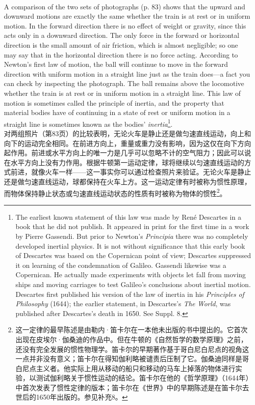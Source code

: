 \documentclass{article}
\begin{document}
\\
A comparison of the two sets of photographs (p. 83) shows that the upward and downward motions are exactly the same whether the train is at rest or in uniform motion. In the forward direction there is no effect of weight or gravity, since this acts only in a downward direction. The only force in the forward or horizontal direction is the small amount of air friction, which is almost negligible; so one may say that in the horizontal direction there is no force acting. According to Newton's first law of motion, the ball will continue to move in the forward direction with uniform motion in a straight line just as the train does—a fact you can check by inspecting the photograph. The ball remains above the locomotive whether the train is at rest or in uniform motion in a straight line. This law of motion is sometimes called the principle of inertia, and the property that material bodies have of continuing in a state of rest or uniform motion in a straight line is sometimes known as the bodies' \textit{inertia}\footnote{The earliest known statement of this law was made by René Descartes in a book that he did not publish. It appeared in print for the first time in a work by Pierre Gassendi. But prior to Newton's \textit{Principia} there was no completely developed inertial physics. It is not without significance that this early book of Descartes was based on the Copernican point of view; Descartes suppressed it on learning of the condemnation of Galileo. Gassendi likewise was a Copernican. He actually made experiments with objects let fall from moving ships and moving carriages to test Galileo's conclusions about inertial motion. Descartes first published his version of the law of inertia in his \textit{Principles of Philosophy} (1644); the earlier statement, in Descartes's \textit{The World}, was published after Descartes's death in 1650. See Suppl. 8.}.\\
对两组照片（第83页）的比较表明，无论火车是静止还是做匀速直线运动，向上和向下的运动完全相同。在前进方向上，重量或重力没有影响，因为这仅在向下方向起作用。前进或水平方向上的唯一力是几乎可以忽略不计的空气阻力；因此可以说在水平方向上没有力作用。根据牛顿第一运动定律，球将继续以匀速直线运动的方式前进，就像火车一样——这一事实你可以通过检查照片来验证。无论火车是静止还是做匀速直线运动，球都保持在火车上方。这一运动定律有时被称为惯性原理，而物体保持静止状态或匀速直线运动状态的性质有时被称为物体的惯性\footnote{这一定律的最早陈述是由勒内·笛卡尔在一本他未出版的书中提出的。它首次出现在皮埃尔·伽桑迪的作品中。但在牛顿的《自然哲学的数学原理》之前，还没有完全发展的惯性物理学。笛卡尔的早期著作基于哥白尼白尼点的视角这一点并非没有意义；笛卡尔在得知伽利略被谴责后压制了它。伽桑迪同样是哥白尼点主义者。他实际上用从移动的船只和移动的马车上掉落的物体进行实验，以测试伽利略关于惯性运动的结论。笛卡尔在他的《哲学原理》（1644年）中首次发表了惯性定律的版本；笛卡尔在《世界》中的早期陈述是在笛卡尔去世后的1650年出版的。参见补充8。}。\\
\end{document}
